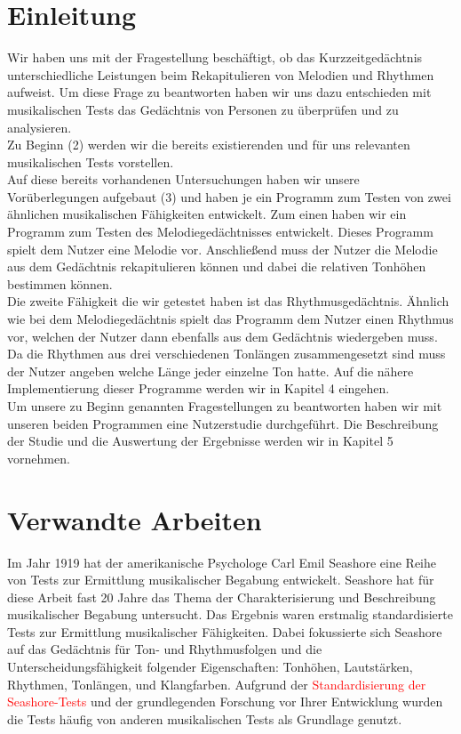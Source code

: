 \documentclass{acm_proc_article-sp}
\begin{document}
\section{Einleitung}
Wir haben uns mit der Fragestellung beschäftigt, ob das Kurzzeitgedächtnis unterschiedliche Leistungen beim Rekapitulieren von Melodien und Rhythmen aufweist. Um diese Frage zu beantworten haben wir uns dazu entschieden mit musikalischen Tests das Gedächtnis von Personen zu überprüfen und zu analysieren.\\
Zu Beginn (2) werden wir die bereits existierenden und für uns relevanten musikalischen Tests vorstellen.\\
Auf diese bereits vorhandenen Untersuchungen haben wir unsere Vorüberlegungen aufgebaut (3) und haben je ein Programm zum Testen von zwei ähnlichen musikalischen Fähigkeiten entwickelt. Zum einen haben wir ein Programm zum Testen des Melodiegedächtnisses entwickelt. Dieses Programm spielt dem Nutzer eine Melodie vor. Anschließend muss der Nutzer die Melodie aus dem Gedächtnis rekapitulieren können und dabei die relativen Tonhöhen bestimmen können.\\
Die zweite Fähigkeit die wir getestet haben ist das Rhythmusgedächtnis. Ähnlich wie bei dem Melodiegedächtnis spielt das Programm dem Nutzer einen Rhythmus vor, welchen der Nutzer dann ebenfalls aus dem Gedächtnis wiedergeben muss. Da die Rhythmen aus drei verschiedenen Tonlängen zusammengesetzt sind muss der Nutzer angeben welche Länge jeder einzelne Ton hatte. Auf die nähere Implementierung dieser Programme werden wir in Kapitel 4 eingehen.\\
Um unsere zu Beginn genannten Fragestellungen zu beantworten haben wir mit unseren beiden Programmen eine Nutzerstudie durchgeführt. Die Beschreibung der Studie und die Auswertung der Ergebnisse werden wir in Kapitel 5 vornehmen.

\section{Verwandte Arbeiten}
Im Jahr 1919 hat der amerikanische Psychologe Carl Emil Seashore eine Reihe von Tests zur Ermittlung musikalischer Begabung entwickelt\cite{gordon:2000}. Seashore hat für diese Arbeit fast 20 Jahre das Thema der Charakterisierung und Beschreibung musikalischer Begabung untersucht. Das Ergebnis waren erstmalig standardisierte Tests zur Ermittlung musikalischer Fähigkeiten. Dabei fokussierte sich Seashore auf das Gedächtnis für Ton- und Rhythmusfolgen und die Unterscheidungsfähigkeit folgender Eigenschaften: Tonhöhen, Lautstärken, Rhythmen, Tonlängen, und Klangfarben.
Aufgrund der \textcolor{red}{Standardisierung der Seashore-Tests} und der grundlegenden Forschung vor Ihrer Entwicklung wurden die Tests häufig von anderen musikalischen Tests als Grundlage genutzt. \\
\end{document}
